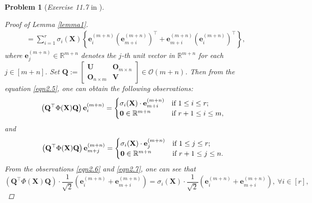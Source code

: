 \documentclass[11pt]{article}
\newtheorem{problem}{Problem}
\numberwithin{equation}{problem}
\begin{document}
\begin{problem} [\emph{Exercise 11.7} in \cite{calafiore2014optimization}]
{\begin{proof} [Proof of Lemma \ref{lemma1}]
\begin{equation}
\begin{split}
        &= \sum_{i=1}^{r} \sigma_i (\mathbf{X}) \left\{ \mathbf{e}_{i}^{(m+n)} \left( \mathbf{e}_{m+i}^{(m+n)} \right)^{\top} + \mathbf{e}_{m+i}^{(m+n)} \left( \mathbf{e}_{i}^{(m+n)} \right)^{\top} \right\},
    \end{split}
\end{equation}
where $\mathbf{e}_{j}^{(m+n)} \in \mathbb{R}^{m+n}$ denotes the $j$-th unit vector in $\mathbb{R}^{m+n}$ for each $j \in \left[ m+n \right]$. Set $\mathbf{Q} := \begin{bmatrix} \mathbf{U} & \mathbf{O}_{m \times n} \\ \mathbf{O}_{n \times m} & \mathbf{V} \end{bmatrix} \in \mathcal{O}(m+n)$. Then from the equation \eqref{eqn2.5}, one can obtain the following observations:
\begin{equation}
    \label{eqn2.6}
    \begin{split}
        \left( \mathbf{Q}^{\top} \Phi (\mathbf{X}) \mathbf{Q} \right) \mathbf{e}_{i}^{(m+n)} =
        \begin{cases}
            \sigma_i (\mathbf{X}) \cdot \mathbf{e}_{m+i}^{(m+n)} & \textnormal{if } 1 \leq i \leq r; \\
            \mathbf{0} \in \mathbb{R}^{m+n} & \textnormal{if } r+1 \leq i \leq m,
        \end{cases}
    \end{split}
\end{equation}
and
\begin{equation}
    \label{eqn2.7}
    \begin{split}
        \left( \mathbf{Q}^{\top} \Phi (\mathbf{X}) \mathbf{Q} \right) \mathbf{e}_{m+j}^{(m+n)} =
        \begin{cases}
            \sigma_i (\mathbf{X}) \cdot \mathbf{e}_{j}^{(m+n)} & \textnormal{if } 1 \leq j \leq r; \\
            \mathbf{0} \in \mathbb{R}^{m+n} & \textnormal{if } r+1 \leq j \leq n.
        \end{cases}
    \end{split}
\end{equation}
From the observations \eqref{eqn2.6} and \eqref{eqn2.7}, one can see that
\begin{equation}
    \label{eqn2.8}
    \left( \mathbf{Q}^{\top} \Phi (\mathbf{X}) \mathbf{Q} \right) \cdot \frac{1}{\sqrt{2}}
    \left( \mathbf{e}_{i}^{(m+n)} + \mathbf{e}_{m+i}^{(m+n)} \right) = 
    \sigma_i (\mathbf{X}) \cdot \frac{1}{\sqrt{2}}
    \left( \mathbf{e}_{i}^{(m+n)} + \mathbf{e}_{m+i}^{(m+n)} \right),\ \forall i \in [r],

\end{equation}
\end{proof}}
\end{problem}
\end{document}
